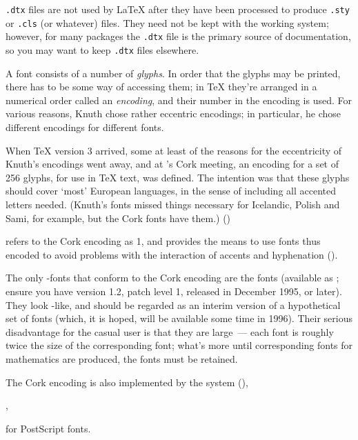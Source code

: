 \texttt{.dtx} files are not used by \LaTeX{} after they have been
processed to produce \texttt{.sty} or \texttt{.cls} (or whatever)
files.  They need not be kept with the working system; however, for
many packages the \texttt{.dtx} file is the primary source of
documentation, so you may want to keep \texttt{.dtx} files elsewhere.


A font consists of a number of \emph{glyphs}.  In order that the
glyphs may be printed, there has to be some way of accessing them; in
\TeX{} they're arranged in a numerical order called an
\emph{encoding}, and their number in the encoding is used.  For
various reasons, Knuth chose rather eccentric encodings; in
particular, he chose different encodings for different fonts.

When \TeX{} version 3 arrived, some at least of the reasons for the
eccentricity of
Knuth's encodings went away, and at 's Cork meeting, an encoding for
a set of 256 glyphs, for use in \TeX{} text, was defined.  The
intention was that these glyphs should cover `most' European
languages, in the sense of including all accented letters needed.
(Knuth's  fonts missed things necessary for Icelandic,
Polish and Sami, for example, but the Cork fonts have them.)
\htmlignore
\LaTeXe{} ()
\endhtmlignore
\begin{htmlversion}
\end{htmlversion}
refers to the Cork encoding as 1, and provides the means to
use fonts thus encoded to avoid problems with the interaction of
accents and hyphenation 
().

The only \MF{}-fonts that conform to the Cork encoding are the
 fonts (available as ; ensure you have version
1.2, patch level 1, released in December 1995, or later).  They look
-like,
and should be regarded as an interim version of a hypothetical set of
 fonts (which, it is hoped, will be available some time in
1996).  Their serious disadvantage for the casual user is
that they are large~--- each  font is roughly twice the size
of the corresponding  font; what's more until corresponding
fonts for mathematics are produced, the  fonts must be
retained.

The Cork encoding is also implemented by the
\htmlignore
{} system (),
\endhtmlignore
\begin{htmlversion}
  ,
\end{htmlversion}
for PostScript fonts.


